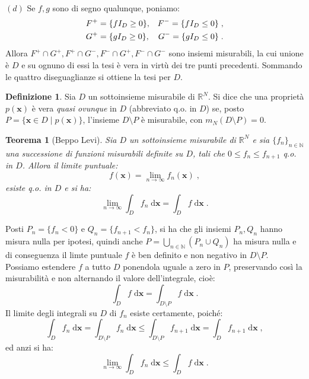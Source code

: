 \documentclass[a4paper,12pt]{report}
\theoremstyle{plain}
\newtheorem{thm}{Teorema}[section]
\theoremstyle{definition}
\newtheorem{defn}{Definizione}[section]
\theoremstyle{remark}
\newcommand{\diff}[1]{\mathrm{d}#1}
\numberwithin{equation}{section}
\begin{document}
$(d)$ Se $f,g$ sono di segno qualunque, poniamo:
\begin{align}
&F^+=\{fI_D\ge 0\}, &F^-=\{fI_D\le 0\}\;, \notag \\
&G^+=\{gI_D\ge 0\}, &G^-=\{gI_D\le 0\}\;.
\end{align}
Allora $F^+\cap G^+,F^+\cap G^-,F^-\cap G^+,F^-\cap G^-$ sono insiemi misurabili, la cui unione è $D$ e su ognuno di essi la tesi è 
vera in virtù dei tre punti precedenti. Sommando le quattro diseguaglianze si ottiene la tesi per $D$.
\endproof
\begin{defn} Sia $D$ un sottoinsieme misurabile di $\mathbb{R}^N$. Si dice che una proprietà $p(\mathbf{x})$ è vera \textit{quasi ovunque} in $D$ (abbreviato q.o. in $D$) se, posto $P=\{\mathbf{x}\in D\;|\;p(\mathbf{x})\}$, l'insieme $D\setminus P$ è misurabile, con $m_N(D\setminus P)=0$.
\end{defn}
\begin{thm}[Beppo Levi] Sia $D$ un sottoinsieme misurabile di $\mathbb{R}^N$ e sia $\{f_n\}_{n\in\mathbb{N}}$ una successione di funzioni misurabili definite su $D$, tali che $0\le f_n\le f_{n+1}$ q.o. in $D$. Allora il limite puntuale:
\begin{equation}
f(\mathbf{x})=\lim_{n\to\infty} f_n(\mathbf{x})\;,
\end{equation}
esiste q.o. in $D$ e si ha:
\begin{equation}
\lim_{n\to\infty}\int_D f_n\;\diff{\mathbf{x}}=\int_D f\;\diff{\mathbf{x}}\;.
\end{equation}
\end{thm}
\proof Posti $P_n=\{f_n<0\}$ e $Q_n=\{f_{n+1}<f_n\}$, si ha che gli insiemi $P_n,Q_n$ hanno misura nulla per ipotesi, quindi anche $P=\bigcup_{n\in\mathbb{N}} (P_n\cup Q_n)$ ha misura nulla e di conseguenza il limte puntuale $f$ è ben definito e non negativo in $D\setminus P$. Possiamo estendere $f$ a tutto $D$ ponendola uguale a zero in $P$, preservando così la misurabilità e non alternando il valore dell'integrale, cioè:
\begin{equation}
\int_D f\;\diff{\mathbf{x}}=\int_{D\setminus P}f\;\diff{\mathbf{x}}\;.
\end{equation}
Il limite degli integrali su $D$ di $f_n$ esiste certamente, poiché:
\begin{equation}
\int_D f_n\;\diff{\mathbf{x}}=\int_{D\setminus P} f_n\;\diff{\mathbf{x}}\le \int_{D\setminus P} f_{n+1}\;\diff{\mathbf{x}}=\int_D f_{n+1}\;\diff{\mathbf{x}}\;,
\end{equation}
ed anzi si ha:
\begin{equation}
\lim_{n\to \infty} \int_D f_n\;\diff{\mathbf{x}}\le \int_D f\;\diff{\mathbf{x}}\;.
\end{equation}
\end{document}
